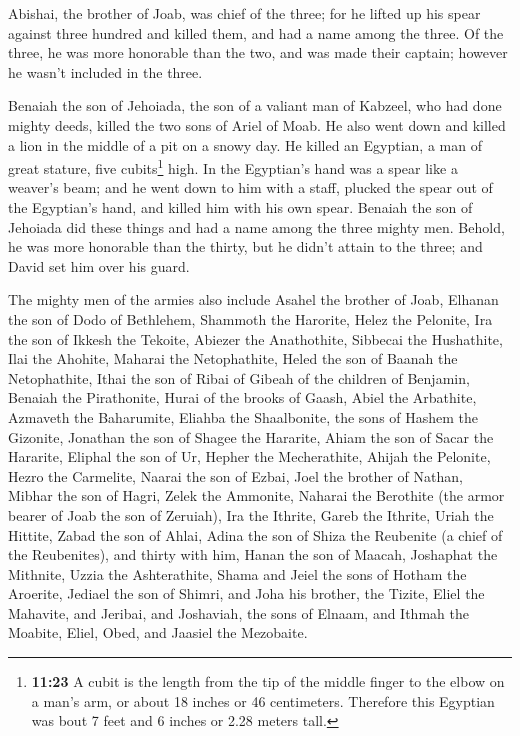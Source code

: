 \begin{paracol}{2}
\begin{otherlanguage}{english}
 Abishai, the brother of Joab, was chief of the three;
for he lifted up his spear against three hundred and killed them, and
had a name among the three.  Of the three, he was more
honorable than the two, and was made their captain; however he wasn't
included in the three.

 Benaiah the son of Jehoiada, the son of a valiant man of
Kabzeel, who had done mighty deeds, killed the two sons of Ariel of
Moab. He also went down and killed a lion in the middle of a pit on a
snowy day.  He killed an Egyptian, a man of great
stature, five cubits\footnote{\textbf{11:23} A cubit is the length from
  the tip of the middle finger to the elbow on a man's arm, or about 18
  inches or 46 centimeters. Therefore this Egyptian was bout 7 feet and
  6 inches or 2.28 meters tall.} high. In the Egyptian's hand was a
spear like a weaver's beam; and he went down to him with a staff,
plucked the spear out of the Egyptian's hand, and killed him with his
own spear.  Benaiah the son of Jehoiada did these things
and had a name among the three mighty men.  Behold, he
was more honorable than the thirty, but he didn't attain to the three;
and David set him over his guard.

 The mighty men of the armies also include Asahel the
brother of Joab, Elhanan the son of Dodo of Bethlehem, 
Shammoth the Harorite, Helez the Pelonite,  Ira the son
of Ikkesh the Tekoite, Abiezer the Anathothite,  Sibbecai
the Hushathite, Ilai the Ahohite,  Maharai the
Netophathite, Heled the son of Baanah the Netophathite, 
Ithai the son of Ribai of Gibeah of the children of Benjamin, Benaiah
the Pirathonite,  Hurai of the brooks of Gaash, Abiel the
Arbathite,  Azmaveth the Baharumite, Eliahba the
Shaalbonite,  the sons of Hashem the Gizonite, Jonathan
the son of Shagee the Hararite,  Ahiam the son of Sacar
the Hararite, Eliphal the son of Ur,  Hepher the
Mecherathite, Ahijah the Pelonite,  Hezro the Carmelite,
Naarai the son of Ezbai,  Joel the brother of Nathan,
Mibhar the son of Hagri,  Zelek the Ammonite, Naharai the
Berothite (the armor bearer of Joab the son of Zeruiah), 
Ira the Ithrite, Gareb the Ithrite,  Uriah the Hittite,
Zabad the son of Ahlai,  Adina the son of Shiza the
Reubenite (a chief of the Reubenites), and thirty with him,
 Hanan the son of Maacah, Joshaphat the Mithnite,
 Uzzia the Ashterathite, Shama and Jeiel the sons of
Hotham the Aroerite,  Jediael the son of Shimri, and Joha
his brother, the Tizite,  Eliel the Mahavite, and
Jeribai, and Joshaviah, the sons of Elnaam, and Ithmah the Moabite,
 Eliel, Obed, and Jaasiel the Mezobaite.


\end{otherlanguage}
\end{paracol}
